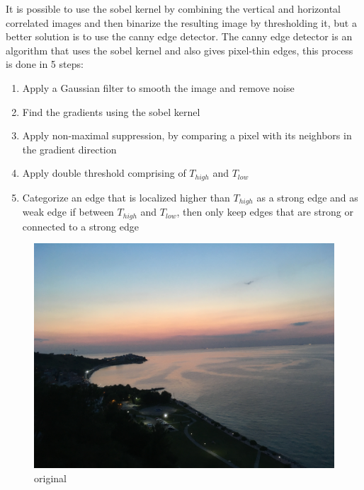 It is possible to use the sobel kernel by combining the vertical and horizontal correlated images and then binarize the resulting image by thresholding it, but a better solution is to use the canny edge detector. The canny edge detector is an algorithm that uses the sobel kernel and also gives pixel-thin edges, this process is done in 5 steps:
\begin{enumerate}
    \item Apply a Gaussian filter to smooth the image and remove noise
    \item Find the gradients using the sobel kernel 
    \item Apply non-maximal suppression, by comparing a pixel with its neighbors in the gradient direction
    \item Apply double threshold comprising of $T_{high}$ and $T_{low}$
    \item Categorize an edge that is localized higher than $T_{high}$ as a strong edge and as weak edge if between $T_{high}$ and $T_{low}$, then only keep edges that are strong or connected to a strong edge
\end{enumerate}

\begin{figure}[H]  %
	\centering
	\includegraphics[width=1\textwidth]{8Misc/Pictures/Introduction/land.JPG}
	\caption{original}
	\label{fig: convolve2}
\end{figure}

